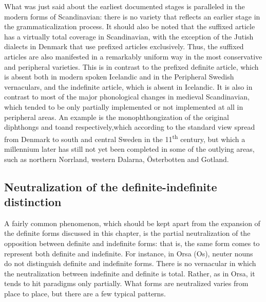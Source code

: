 What was just said about the earliest documented stages is paralleled in the modern forms of Scandinavian: there is no variety that reflects an earlier stage in the grammaticalization process. It should also be noted that the suffixed article has a virtually total coverage in Scandinavian, with the exception of the Jutish dialects in Denmark that use prefixed articles exclusively. Thus, the suffixed articles are also manifested in a remarkably uniform way in the most conservative and peripheral varieties. This is in contrast to the prefixed definite article, which is absent both in modern spoken Icelandic and in the Peripheral Swedish vernaculars, and the indefinite article, which is absent in Icelandic. It is also in contrast to most of the major phonological changes in medieval Scandinavian, which tended to be only partially implemented or not implemented at all in peripheral areas. An example is the monophthongization of the original diphthongs  and toand respectively,\textstyleLinguisticExample{ }which according to the standard view spread from Denmark to south and central Sweden in the 11\textsuperscript{th} century, but which a millennium later has still not yet been completed in some of the outlying areas, such as northern Norrland, western Dalarna, Österbotten and Gotland.  


\subsection{\rmfamily Neutralization of the definite-indefinite distinction}
\label{bkm:Ref114304507}
A fairly common phenomenon, which should be kept apart from the expansion of the definite forms discussed in this chapter, is the partial neutralization of the opposition between definite and indefinite forms: that is, the same form comes to represent both definite and indefinite. For instance, in Orsa (Os), neuter nouns do not distinguish definite and indefinite forms. There is no vernacular in which the neutralization between indefinite and definite is total. Rather, as in Orsa, it tends to hit paradigms only partially. What forms are neutralized varies from place to place, but there are a few typical patterns.

